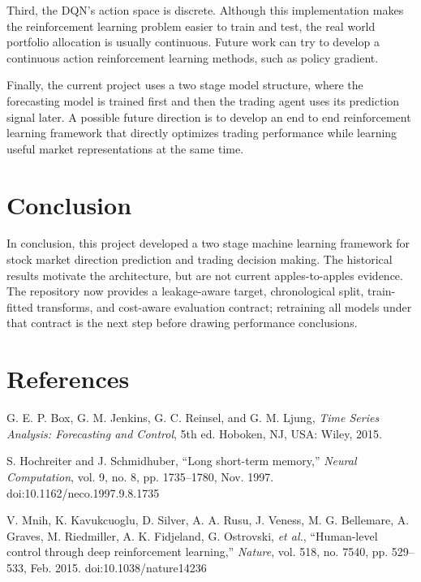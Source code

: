 \documentclass{article}
\begin{document}
Third, the DQN's action space is discrete. Although this implementation makes the reinforcement learning problem easier to train and test, the real world portfolio allocation is usually continuous. Future work can try to develop a continuous action reinforcement learning methods, such as policy gradient.

Finally, the current project uses a two stage model structure, where the forecasting model is trained first and then the trading agent uses its prediction signal later. A possible future direction is to develop an end to end reinforcement learning framework that directly optimizes trading performance while learning useful market representations at the same time. 

\section{Conclusion}

In conclusion, this project developed a two stage machine learning framework for stock market direction prediction and trading decision making. The historical results motivate the architecture, but are not current apples-to-apples evidence. The repository now provides a leakage-aware target, chronological split, train-fitted transforms, and cost-aware evaluation contract; retraining all models under that contract is the next step before drawing performance conclusions.


\section*{References}

\par [1] G. E. P. Box, G. M. Jenkins, G. C. Reinsel, and G. M. Ljung, \textit{Time Series Analysis: Forecasting and Control}, 5th ed. Hoboken, NJ, USA: Wiley, 2015.

\par [2] S. Hochreiter and J. Schmidhuber, ``Long short-term memory,'' \textit{Neural Computation}, vol. 9, no. 8, pp. 1735--1780, Nov. 1997. doi:10.1162/neco.1997.9.8.1735

\par [3] V. Mnih, K. Kavukcuoglu, D. Silver, A. A. Rusu, J. Veness, M. G. Bellemare, A. Graves, M. Riedmiller, A. K. Fidjeland, G. Ostrovski, \textit{et al.}, ``Human-level control through deep reinforcement learning,'' \textit{Nature}, vol. 518, no. 7540, pp. 529--533, Feb. 2015. doi:10.1038/nature14236
\end{document}
